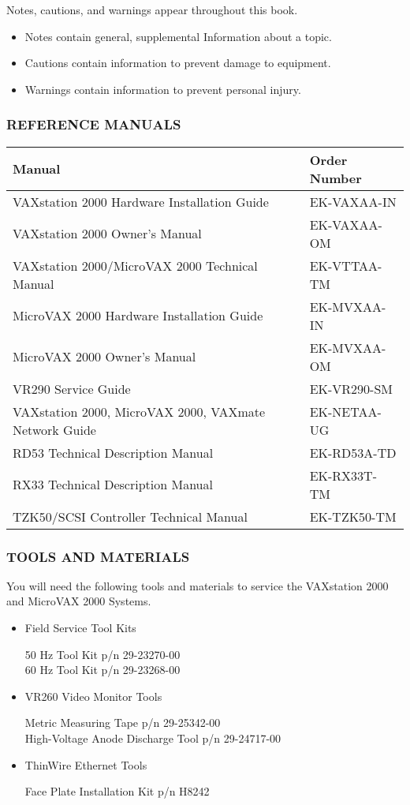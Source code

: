 Notes, cautions, and warnings appear throughout this book.

\begin{itemize}
\item Notes contain general, supplemental Information about a topic.
\item Cautions contain information to prevent damage to equipment.
\item Warnings contain information to prevent personal injury.
\end{itemize}
\newpage
\subsubsection*{REFERENCE MANUALS}
\begin{tabularx}{\textwidth}{l l}
\hline
\textbf{Manual} & \textbf{Order Number} \\
\hline
VAXstation 2000 Hardware Installation Guide & EK-VAXAA-IN \\
VAXstation 2000 Owner's Manual & EK-VAXAA-OM \\
VAXstation 2000/MicroVAX 2000 Technical Manual & EK-VTTAA-TM \\
MicroVAX 2000 Hardware Installation Guide & EK-MVXAA-IN \\
MicroVAX 2000 Owner's Manual & EK-MVXAA-OM \\
VR290 Service Guide & EK-VR290-SM \\
VAXstation 2000, MicroVAX 2000, VAXmate Network Guide & EK-NETAA-UG \\
RD53 Technical Description Manual & EK-RD53A-TD \\
RX33 Technical Description Manual & EK-RX33T-TM \\
TZK50/SCSI Controller Technical Manual & EK-TZK50-TM \\
\hline

\end{tabularx}

\subsubsection*{TOOLS AND MATERIALS}
You will need the following tools and materials to service the VAXstation
2000 and MicroVAX 2000 Systems.

\begin{itemize}
\item Field Service Tool Kits

50 Hz Tool Kit p/n 29-23270-00\\
60 Hz Tool Kit p/n 29-23268-00

\item VR260 Video Monitor Tools

Metric Measuring Tape p/n 29-25342-00\\
High-Voltage Anode Discharge Tool p/n 29-24717-00

\item ThinWire Ethernet Tools

Face Plate Installation Kit p/n H8242
\end{itemize}

